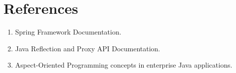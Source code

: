\documentclass[12pt,a4paper]{article}
\begin{document}
\section*{References}
\begin{enumerate}[label=\arabic*.]
    \item Spring Framework Documentation.
    \item Java Reflection and Proxy API Documentation.
    \item Aspect-Oriented Programming concepts in enterprise Java applications.
\end{enumerate}
\end{document}
